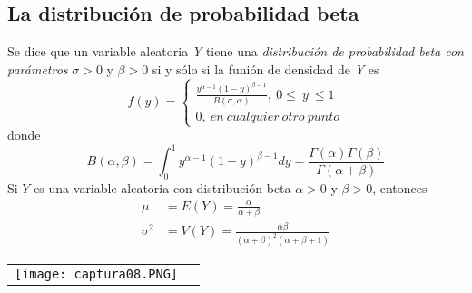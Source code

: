 \documentclass[10pt]{article}\usepackage[]{graphicx}\usepackage[]{color}
\begin{document}
\subsection{La distribución de probabilidad beta}
Se dice que un variable aleatoria \textit{Y} tiene una \textit{distribución de probabilidad beta con parámetros} $\sigma>0$ y $\beta>0$ si y sólo si la funión de densidad de \textit{Y} es
\begin{equation*}
f(y)=\left\lbrace\begin{array}{c} \frac{y^{\alpha-1}(1-y)^{\beta-1}}{B(\sigma,\alpha)},~0\leq~ y ~\leq 1
\\ 0, ~en~ cualquier~ otro ~punto \end{array}\right.
\end{equation*}
donde
\begin{equation*}
B(\alpha,\beta)=\int_{0}^{1}y^{\alpha-1}(1-y)^{\beta-1}dy=\frac{\Gamma(\alpha)\Gamma(\beta)}{\Gamma(\alpha+\beta)}
\end{equation*}
Si $Y$ es una variable aleatoria con distribución beta $\alpha > 0$ y $\beta > 0$, entonces
\begin{align*}
\mu&=E(Y)=\frac{\alpha}{\alpha+\beta}\\
\sigma^2&=V(Y)=\frac{\alpha\beta}{(\alpha+\beta)^2(\alpha+\beta+1)}
\end{align*}
\begin{tabular}{p{} p{} }
\texttt{[image: captura08.PNG]}
\end{tabular}\\







\newpage
\end{document}

